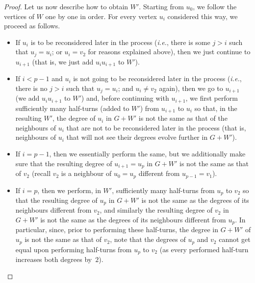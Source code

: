 \documentclass[a4paper,11pt,dvipsnames]{elsarticle}
\newcommand{\sam}[1]{\todo[size=\tiny,color=red!20!white]{\textbf{Sam:} #1}}
\newcommand{\sam}[1]{}
\begin{document}
\begin{proof}
Let us now describe how to obtain $W'$.
Starting from $u_0$, we follow the vertices of $W$ one by one in order.
For every vertex $u_i$ considered this way, we proceed as follows.	

\begin{itemize}
	\item If $u_i$ is to be reconsidered later in the process
	(\textit{i.e.}, there is some $j>i$ such that $u_j=u_i$; or $u_i=v_2$ for reasons explained above),
	then we just continue to $u_{i+1}$ (that is, we just add $u_iu_{i+1}$ to $W'$).
	
	\item If $i < p-1$ and $u_i$ is not going to be reconsidered later in the process 
	(\textit{i.e.}, there is no $j>i$ such that $u_j=u_i$; and $u_i\neq v_2$ again),
	then we go to $u_{i+1}$ (we add $u_iu_{i+1}$ to $W'$) and, before continuing with $u_{i+1}$,
	we first perform sufficiently many half-turns (added to $W'$) from $u_{i+1}$ to $u_i$
	so that, in the resulting $W'$, the degree of $u_i$ in $G+W'$ is not the same
	as that of the neighbours of $u_i$ that are not to be reconsidered later in the process
	(that is, neighbours of $u_i$ that will not see their degrees evolve further in $G+W'$).
	
	\item If $i=p-1$, then we essentially perform the same, but we additionally make sure that the resulting degree of $u_{i+1}=u_{p}$ in $G+W'$ is not the same as that of $v_2$
	(recall $v_2$ is a neighbour of $u_0=u_p$ different from $u_{p-1}=v_1$).
	
	\item If $i=p$, then we perform, in $W'$, sufficiently many half-turns from $u_p$ to $v_2$ so that the resulting degree of $u_p$ in $G+W'$ is not the same as the degrees of its neighbours different from $v_2$,
	and similarly the resulting degree of $v_2$ in $G+W'$ is not the same as the degrees of its neighbours different from $u_p$.
	In particular, since, prior to performing these half-turns, the degree in $G+W'$ of $u_p$ is not the same as that of $v_2$, note that the degrees of $u_p$ and $v_2$ cannot get equal upon performing
	half-turns from $u_p$ to $v_2$ (as every performed half-turn increases both degrees by~$2$).
\end{itemize}


\end{proof}
\end{document}
